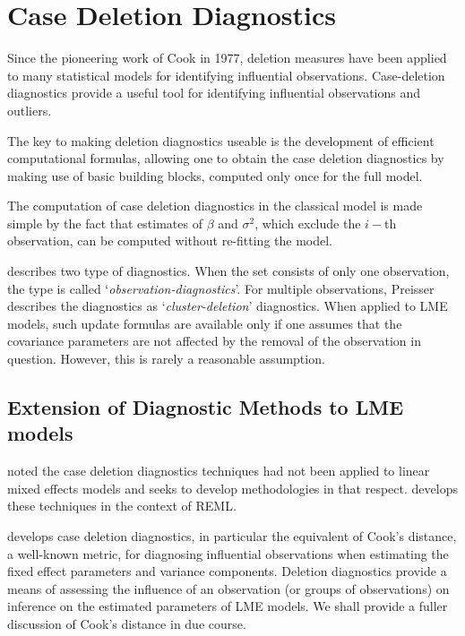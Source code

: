 \documentclass[MAIN.tex]{subfiles}
\begin{document}
	
\section{Case Deletion Diagnostics}

Since the pioneering work of Cook in 1977, deletion measures have been applied to many statistical models for identifying influential observations. Case-deletion diagnostics provide a useful tool for identifying influential observations and outliers.

The key to making deletion diagnostics useable is the development of efficient computational formulas, allowing one to obtain the  case deletion diagnostics by making use of basic building blocks, computed only once for the full model.

The computation of case deletion diagnostics in the classical model is made simple by the fact that estimates of $\beta$ and $\sigma^2$, which exclude the $i-$th observation, can be computed without re-fitting the model. %

\citet{preisser} describes two type of diagnostics. When the set consists of only one observation, the type is called
`\textit{observation-diagnostics}'. For multiple observations, Preisser describes the diagnostics as `\textit{cluster-deletion}' diagnostics. When applied to LME models, such update formulas are available only if one assumes that the covariance parameters are not affected by the removal of the observation in question. However, this is rarely a reasonable assumption.



\subsection{Extension of Diagnostic Methods to LME models}

\citet{CPJ} noted the case deletion diagnostics techniques had not been applied to linear mixed effects models and seeks to develop methodologies in that respect. \citet{CPJ} develops these techniques in the context of REML.

\citet{CPJ} develops  case deletion diagnostics, in particular the equivalent of  Cook's distance, a well-known metric, for diagnosing influential observations when estimating the fixed effect parameters and variance components. Deletion diagnostics provide a means of assessing the influence of an observation (or groups of observations) on inference on the estimated parameters of LME models. We shall provide a fuller discussion of Cook's distance in due course.
\end{document}
